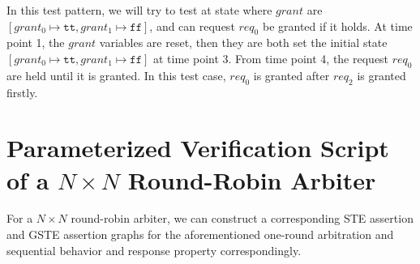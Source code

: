 \documentclass[final]{IEEEtran}
\begin{document}
In this test pattern, we will try to test at state where $grant$ are
$[grant_0 \mapsto \mathtt{tt}, grant_1\mapsto \mathtt{ff}]$, and can
request $req_0$ be granted if it holds. At time point 1, the $grant$
variables are reset, then they are both set the initial state
$[grant_0 \mapsto \mathtt{tt}, grant_1\mapsto \mathtt{ff}]$ at time
point 3. From time point 4, the request $req_0$ are held until it is
granted. In this test case, $req_0$ is granted after $req_2$ is
granted firstly.



\section{Parameterized Verification Script of a $N \times N $ Round-Robin Arbiter}
\label{sec:Verification} For a $N \times N$  round-robin arbiter, we
can construct a corresponding STE assertion and GSTE assertion
graphs for the aforementioned one-round arbitration and sequential
behavior and response property correspondingly.
\end{document}
